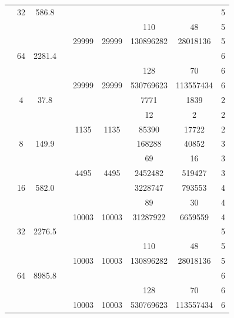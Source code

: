 \begin{table}[htbp]
\begin{tabular}{l S[table-format=3.0] S[table-format=4.1] l S[table-format=6.0] S[table-format=6.0] S[table-format=6.0] S[table-format=5.0] S[table-format=2.0]}
     & 32 & 586.8 &  & {\text{---}} & {\text{---}} & {\text{---}} & {\text{---}} & 5 \\
     &  &  &  & {\text{---}} & {\text{---}} & 110 & 48 & 5 \\
     &  &  &  & 29999 & 29999 & 130896282 & 28018136 & 5 \\
     & 64 & 2281.4 &  & {\text{---}} & {\text{---}} & {\text{---}} & {\text{---}} & 6 \\
     &  &  &  & {\text{---}} & {\text{---}} & 128 & 70 & 6 \\
     &  &  &  & 29999 & 29999 & 530769623 & 113557434 & 6 \\
    \midrule
     & 4 & 37.8 &  & {\text{---}} & {\text{---}} & 7771 & 1839 & 2 \\
     &  &  &  & {\text{---}} & {\text{---}} & 12 & 2 & 2 \\
     &  &  &  & 1135 & 1135 & 85390 & 17722 & 2 \\
     & 8 & 149.9 &  & {\text{---}} & {\text{---}} & 168288 & 40852 & 3 \\
     &  &  &  & {\text{---}} & {\text{---}} & 69 & 16 & 3 \\
     &  &  &  & 4495 & 4495 & 2452482 & 519427 & 3 \\
     & 16 & 582.0 &  & {\text{---}} & {\text{---}} & 3228747 & 793553 & 4 \\
     &  &  &  & {\text{---}} & {\text{---}} & 89 & 30 & 4 \\
     &  &  &  & 10003 & 10003 & 31287922 & 6659559 & 4 \\
     & 32 & 2276.5 &  & {\text{---}} & {\text{---}} & {\text{---}} & {\text{---}} & 5 \\
     &  &  &  & {\text{---}} & {\text{---}} & 110 & 48 & 5 \\
     &  &  &  & 10003 & 10003 & 130896282 & 28018136 & 5 \\
     & 64 & 8985.8 &  & {\text{---}} & {\text{---}} & {\text{---}} & {\text{---}} & 6 \\
     &  &  &  & {\text{---}} & {\text{---}} & 128 & 70 & 6 \\
     &  &  &  & 10003 & 10003 & 530769623 & 113557434 & 6 \\
    \bottomrule
  \end{tabular}
\end{table}
